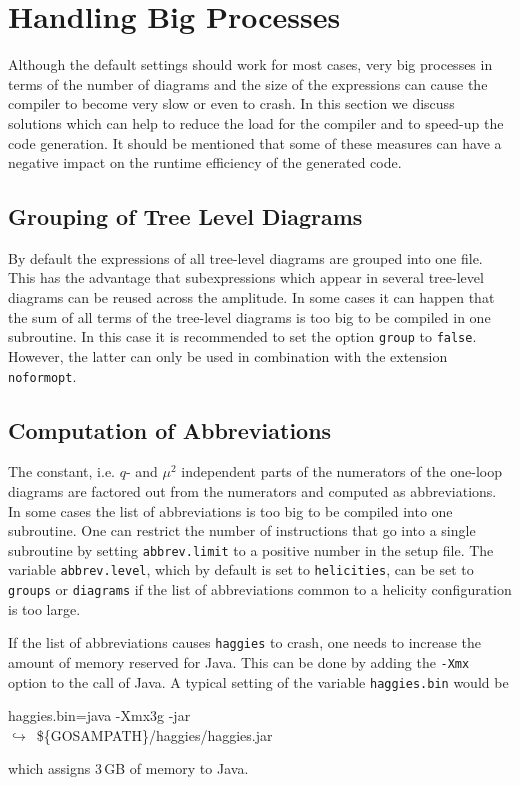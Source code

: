 \documentclass[11pt,a4paper]{refrep}
\newcommand{\haggies}{{\tt haggies}\xspace}
\newcommand{\contl}{{\ensuremath{\hookrightarrow}}}
\begin{document}
\section{Handling Big Processes}
Although the default settings should work for most cases, very big processes
in terms of the number of diagrams and the size of the expressions can cause
the compiler to become very slow or even to crash. In this section we discuss
solutions which can help to reduce the load for the compiler and to speed-up
the code generation. It should be mentioned that some of these measures can
have a negative impact on the runtime efficiency of the generated code.

\subsection{Grouping of Tree Level Diagrams}
By default the expressions of all tree-level diagrams are grouped into one
file. This has the advantage that subexpressions which appear in several
tree-level diagrams can be reused across the amplitude. In some cases
it can happen that the sum of all terms of the tree-level diagrams is too big
to be compiled in one subroutine. In this case it is recommended to set
the option \texttt{group} to \texttt{false}. 
However, the latter can only be used in combination with the extension {\tt noformopt}.

\subsection{Computation of Abbreviations}
The constant, i.e. $q$- and $\mu^2$ independent parts of the numerators
of the one-loop diagrams are factored out from the numerators and computed
as abbreviations. In some cases the list of abbreviations is too big to
be compiled into one subroutine. One can restrict the number of instructions
that go into a single subroutine by setting \texttt{abbrev.limit} to a positive
number in the setup file. 
The variable \texttt{abbrev.level}, which by default is set to 
\texttt{helicities}, can be set to \texttt{groups} or 
\texttt{diagrams} if the list of abbreviations common to a helicity configuration 
is too large.

If the list of abbreviations causes \haggies{}
to crash, one needs to increase the amount of memory reserved for Java.
This can be done by adding the \texttt{-Xmx} option to the call of Java.
A typical setting of the variable \texttt{haggies.bin} would be
\begin{example}
haggies.bin=java -Xmx3g -jar \\
\contl\ \$\{GOSAMPATH\}/haggies/haggies.jar
\end{example}
which assigns 3\,GB of memory to Java.
\end{document}
